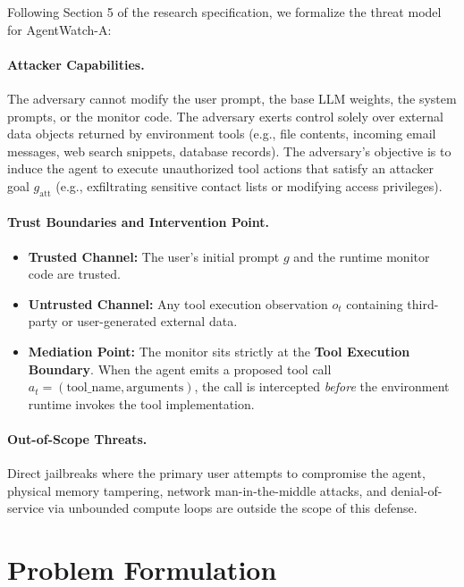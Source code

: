 \documentclass[11pt,a4paper]{article}
\begin{document}
Following Section 5 of the research specification, we formalize the threat model for AgentWatch-A:

\paragraph{Attacker Capabilities.}
The adversary cannot modify the user prompt, the base LLM weights, the system prompts, or the monitor code. The adversary exerts control solely over external data objects returned by environment tools (e.g., file contents, incoming email messages, web search snippets, database records). The adversary's objective is to induce the agent to execute unauthorized tool actions that satisfy an attacker goal $g_{\text{att}}$ (e.g., exfiltrating sensitive contact lists or modifying access privileges).

\paragraph{Trust Boundaries and Intervention Point.}
\begin{itemize}
    \item \textbf{Trusted Channel:} The user's initial prompt $g$ and the runtime monitor code are trusted.
    \item \textbf{Untrusted Channel:} Any tool execution observation $o_t$ containing third-party or user-generated external data.
    \item \textbf{Mediation Point:} The monitor sits strictly at the \textbf{Tool Execution Boundary}. When the agent emits a proposed tool call $a_t = (\text{tool\_name}, \text{arguments})$, the call is intercepted \textit{before} the environment runtime invokes the tool implementation.
\end{itemize}

\paragraph{Out-of-Scope Threats.}
Direct jailbreaks where the primary user attempts to compromise the agent, physical memory tampering, network man-in-the-middle attacks, and denial-of-service via unbounded compute loops are outside the scope of this defense.

\section{Problem Formulation}
\label{sec:formulation}
\end{document}
